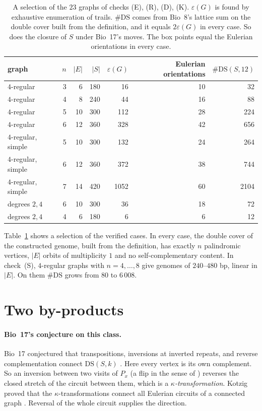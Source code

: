 \documentclass[11pt]{article}
\theoremstyle{plain}
\theoremstyle{definition}
\theoremstyle{remark}
\newcommand{\DS}{\mathrm{DS}}
\begin{document}
\begin{table}[t]
\centering\small
\begin{tabular}{lrrrrrr}
\toprule
graph & $n$ & $|E|$ & $|S|$ & $\varepsilon(G)$ & Eulerian orientations & $\#\DS(S,12)$\\
\midrule
$4$-regular & 3 & 6 & 180 & 16 & 10 & 32\\
$4$-regular & 4 & 8 & 240 & 44 & 16 & 88\\
$4$-regular & 5 & 10 & 300 & 112 & 28 & 224\\
$4$-regular & 6 & 12 & 360 & 328 & 42 & 656\\
$4$-regular, simple & 5 & 10 & 300 & 132 & 24 & 264\\
$4$-regular, simple & 6 & 12 & 360 & 372 & 38 & 744\\
$4$-regular, simple & 7 & 14 & 420 & 1052 & 60 & 2104\\
degrees $2,4$ & 6 & 10 & 300 & 36 & 18 & 72\\
degrees $2,4$ & 4 & 6 & 180 & 6 & 6 & 12\\
\bottomrule
\end{tabular}
\caption{A selection of the $23$ graphs of checks (E), (R), (D), (K). $\varepsilon(G)$ is found by exhaustive
enumeration of trails. $\#\DS$ comes from Bio~8's lattice sum on the double cover built from the
definition, and it equals $2\varepsilon(G)$ in every case. So does the closure of $S$ under Bio~17's
moves. The box points equal the Eulerian orientations in every case.}\label{tab:res}
\end{table}

Table~\ref{tab:res} shows a selection of the verified cases. In every case, the double cover of the
constructed genome, built from the definition, has exactly $n$ palindromic vertices, $|E|$ orbits of
multiplicity $1$ and no self-complementary content. In check~(S), $4$-regular graphs with $n=4,\dots,8$
give genomes of $240$--$480$ bp, linear in $|E|$. On them $\#\DS$ grows from $80$ to $6\,008$.

\section{Two by-products}\label{sec:by}

\paragraph{Bio~17's conjecture on this class.} Bio~17 conjectured that transpositions, inversions at
inverted repeats, and reverse complementation connect $\DS(S,k)$ \cite{Bio17}. Here every vertex is its
own complement. So an inversion between two visits of $P_x$ (a flip in the sense of
\cite[\S7]{Bio8}) reverses the closed stretch of the circuit between them, which is a
\emph{$\kappa$-transformation}. Kotzig proved that the $\kappa$-transformations
connect all Eulerian circuits of a connected graph \cite{Kot68,Fle90}. Reversal of the whole circuit
supplies the direction.
\end{document}
